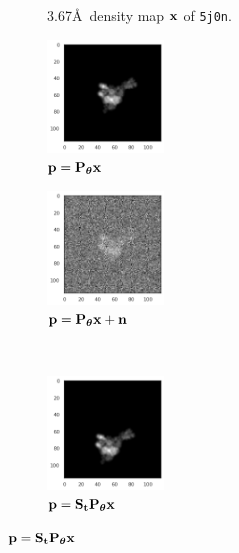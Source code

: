 \begin{figure}[ht!]
\begin{minipage}[b]{0.51\linewidth}
\begin{subfigure}[b]{0.49\linewidth}
            \caption{3.67\AA\ density map $\mathbf{x}$ of \texttt{5j0n}.}
        \end{subfigure}
        \caption{%
            Two proteins with different symmetries.
        }\label{fig:pdb-proteins}
    \end{minipage}
    \hfill
    \begin{minipage}[b]{0.48\linewidth}
        \centering
        \begin{subfigure}[b]{0.49\linewidth}
            \centering
            \includegraphics[height=3cm]{figures/5j0n_noise0}
            \caption{$\mathbf{p} = \mathbf{P}_{{\boldsymbol{\theta}}} \mathbf{x}$}
        \end{subfigure}
        \hfill
        \begin{subfigure}[b]{0.49\linewidth}
            \centering
            \includegraphics[height=3cm]{figures/5j0n_noise16}
            \caption{$\mathbf{p} = \mathbf{P}_{{\boldsymbol{\theta}}} \mathbf{x} + \mathbf{n}$}
        \end{subfigure}
        \\ \vspace{0.5em}
        \begin{subfigure}[b]{0.49\linewidth}
            \centering
            \includegraphics[height=3cm]{figures/5j0n_translated}
            \caption{$\mathbf{p} = \mathbf{S}_{\mathbf{t}} \mathbf{P}_{{\boldsymbol{\theta}}} \mathbf{x}$}

\end{subfigure}
\end{minipage}
\end{figure}

